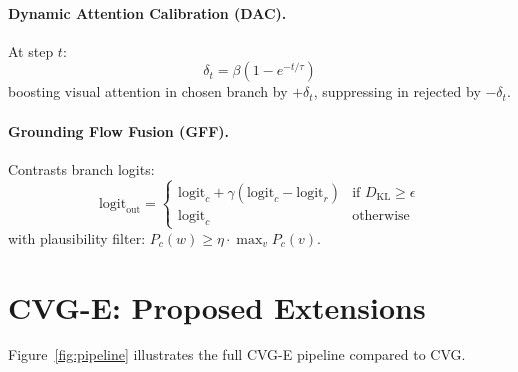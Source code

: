 \documentclass[10pt,twocolumn]{article}
\begin{document}
\paragraph{Dynamic Attention Calibration (DAC).} At step $t$:
\begin{equation}
\delta_t = \beta(1 - e^{-t/\tau}) \label{eq:dac}
\end{equation}
boosting visual attention in chosen branch by $+\delta_t$, suppressing in rejected by $-\delta_t$.

\paragraph{Grounding Flow Fusion (GFF).} Contrasts branch logits:
\begin{equation}
\text{logit}_{\text{out}} = \begin{cases}
\text{logit}_c + \gamma(\text{logit}_c - \text{logit}_r) & \text{if } D_{\text{KL}} \geq \epsilon \\
\text{logit}_c & \text{otherwise}
\end{cases} \label{eq:gff}
\end{equation}
with plausibility filter: $P_c(w) \geq \eta \cdot \max_v P_c(v)$.

\section{CVG-E: Proposed Extensions}
\label{sec:method}

Figure~\ref{fig:pipeline} illustrates the full CVG-E pipeline compared to CVG.
\end{document}

